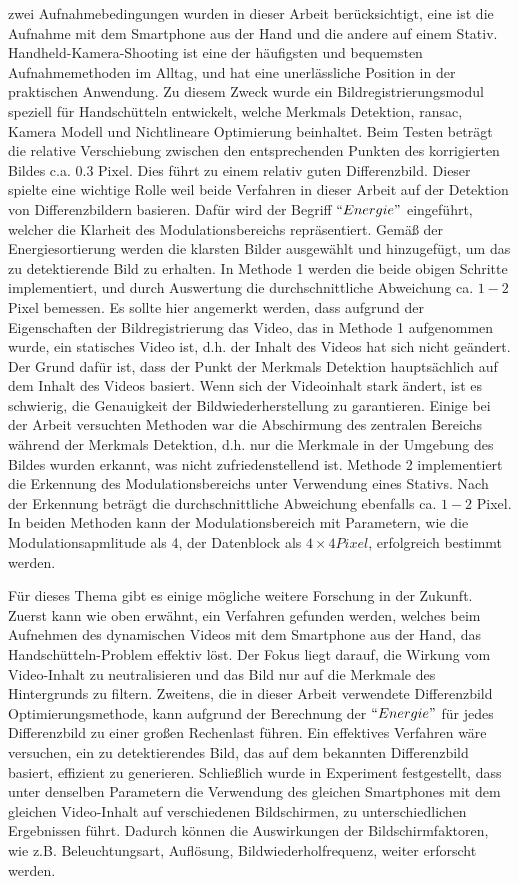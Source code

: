 zwei Aufnahmebedingungen wurden in dieser Arbeit berücksichtigt, eine ist die Aufnahme mit dem Smartphone aus der Hand und die andere auf einem Stativ. Handheld-Kamera-Shooting ist eine der häufigsten und bequemsten Aufnahmemethoden im Alltag, und hat eine unerlässliche Position in der praktischen Anwendung. Zu diesem Zweck wurde ein Bildregistrierungsmodul speziell für Handschütteln entwickelt, welche Merkmals Detektion, \gls{ransac}, Kamera Modell und Nichtlineare Optimierung beinhaltet. Beim Testen beträgt die relative Verschiebung zwischen den entsprechenden Punkten des korrigierten Bildes c.a. 0.3 Pixel. Dies führt zu einem relativ guten Differenzbild. Dieser spielte eine wichtige Rolle weil beide Verfahren in dieser Arbeit auf der Detektion von Differenzbildern basieren. Dafür wird der Begriff $ ``Energie" $ eingeführt, welcher die Klarheit des Modulationsbereichs repräsentiert. Gemäß der Energiesortierung werden die klarsten Bilder ausgewählt und hinzugefügt, um das zu detektierende Bild zu erhalten. In Methode 1 werden die beide obigen Schritte implementiert, und durch Auswertung die durchschnittliche Abweichung ca. $ 1-2 $ Pixel bemessen. Es sollte hier angemerkt werden, dass aufgrund der Eigenschaften der Bildregistrierung das Video, das in Methode 1 aufgenommen wurde, ein statisches Video ist, d.h. der Inhalt des Videos hat sich nicht geändert. Der Grund dafür ist, dass der Punkt der Merkmals Detektion hauptsächlich auf dem Inhalt des Videos basiert. Wenn sich der Videoinhalt stark ändert, ist es schwierig, die Genauigkeit der Bildwiederherstellung zu garantieren. Einige bei der Arbeit versuchten Methoden war die Abschirmung des zentralen Bereichs während der Merkmals Detektion, d.h. nur die Merkmale in der Umgebung des Bildes wurden erkannt, was nicht zufriedenstellend ist. Methode 2 implementiert die Erkennung des Modulationsbereichs unter Verwendung eines Stativs. Nach der Erkennung beträgt die durchschnittliche Abweichung ebenfalls ca. $ 1-2 $ Pixel. In beiden Methoden kann der Modulationsbereich mit Parametern, wie die Modulationsapmlitude als 4,  der Datenblock als $ 4 \times 4 Pixel$, erfolgreich bestimmt werden. 

Für dieses Thema gibt es einige mögliche weitere Forschung in der Zukunft. Zuerst kann wie oben erwähnt, ein Verfahren gefunden werden, welches beim Aufnehmen des dynamischen Videos mit dem Smartphone aus der Hand, das Handschütteln-Problem effektiv löst. Der Fokus liegt darauf, die Wirkung vom Video-Inhalt zu neutralisieren und das Bild nur auf die Merkmale des Hintergrunds zu filtern. Zweitens, die in dieser Arbeit verwendete Differenzbild Optimierungsmethode, kann aufgrund der Berechnung der $ ``Energie" $ für jedes Differenzbild zu einer großen Rechenlast führen. Ein effektives Verfahren wäre versuchen, ein zu detektierendes Bild, das auf dem bekannten Differenzbild basiert, effizient zu generieren. Schließlich wurde in Experiment festgestellt, dass unter denselben Parametern die Verwendung des gleichen Smartphones mit dem gleichen Video-Inhalt auf verschiedenen Bildschirmen, zu unterschiedlichen Ergebnissen führt. Dadurch können die Auswirkungen der Bildschirmfaktoren, wie z.B. Beleuchtungsart, Auflösung, Bildwiederholfrequenz, weiter erforscht werden.




